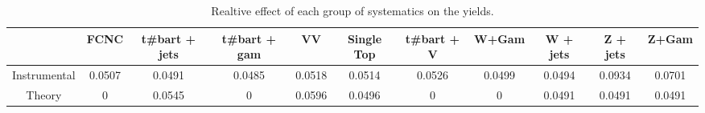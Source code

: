 \begin{table}[htbp]
\begin{center}
\begin{tabular}{|c|c|c|c|c|c|c|c|c|c|c|}
\hline 
      & FCNC      & t#bar{t} + jets      & t#bar{t} +  gam      & VV      & Single Top      & t#bar{t} + V      & W+Gam      & W + jets      & Z + jets      & Z+Gam \\ 
\hline 
 Instrumental & 0.0507 & 0.0491 & 0.0485 & 0.0518 & 0.0514 & 0.0526 & 0.0499 & 0.0494 & 0.0934 & 0.0701 \\ 
 Theory & 0 & 0.0545 & 0 & 0.0596 & 0.0496 & 0 & 0 & 0.0491 & 0.0491 & 0.0491 \\ 
\hline 
\end{tabular} 
\caption{Realtive effect of each group of systematics on the yields.} 
\end{center} 
\end{table} 
